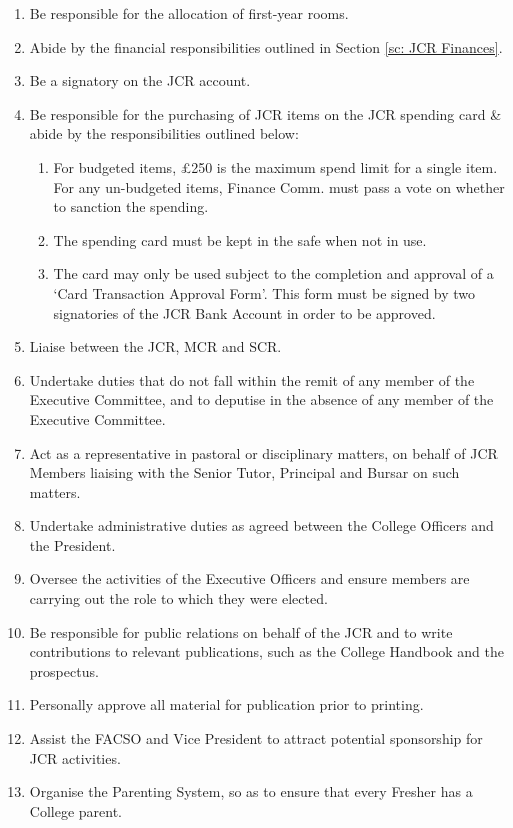 \begin{enumerate}
        \item Be responsible for the allocation of first-year rooms.
        \item Abide by the financial responsibilities outlined in Section \ref{sc: JCR Finances}.
        \item Be a signatory on the JCR account.
        \item Be responsible for the purchasing of JCR items on the JCR spending card & abide by the responsibilities outlined below:
        \begin{enumerate}
            \item For budgeted items, £250 is the maximum spend limit for a single item. For any un-budgeted items, Finance Comm. must pass a vote on whether to sanction the spending.
            \item The spending card must be kept in the safe when not in use.
            \item The card may only be used subject to the completion and approval of a ‘Card Transaction Approval Form’. This form must be signed by two signatories of the JCR Bank Account in order to be approved.
        \end{enumerate}
        \item Liaise between the JCR, MCR and SCR.
        \item Undertake duties that do not fall within the remit of any member of the Executive Committee, and to deputise in the absence of any member of the Executive Committee.
        \item Act as a representative in pastoral or disciplinary matters, on behalf of JCR Members liaising with the Senior Tutor, Principal and Bursar on such matters.
        \item Undertake administrative duties as agreed between the College Officers and the President.
        \item Oversee the activities of the Executive Officers and ensure members are carrying out the role to which they were elected.
        \item Be responsible for public relations on behalf of the JCR and to write contributions to relevant publications, such as the College Handbook and the prospectus.
        \item Personally approve all material for publication prior to printing.
        \item Assist the FACSO and Vice President to attract potential sponsorship for JCR activities.
        \item Organise the Parenting System, so as to ensure that every Fresher has a College parent.

\end{enumerate}
